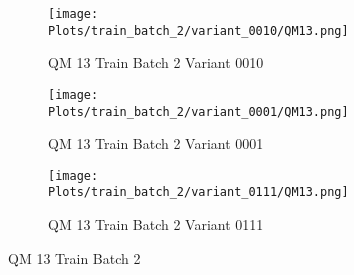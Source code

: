\documentclass{DissertateFigs}
\begin{document}
\begin{figure}[t!]
\medskip

    \begin{subfigure}{0.47\textwidth}
    \texttt{[image: Plots/train\_batch\_2/variant\_0010/QM13.png]}
    \caption{QM 13 Train Batch 2 Variant 0010}
    \end{subfigure}
    \begin{subfigure}{0.47\textwidth}
    \texttt{[image: Plots/train\_batch\_2/variant\_0001/QM13.png]}
    \caption{QM 13 Train Batch 2 Variant 0001}
    \end{subfigure}

\medskip

    \begin{subfigure}{0.47\textwidth}
    \texttt{[image: Plots/train\_batch\_2/variant\_0111/QM13.png]}
    \caption{QM 13 Train Batch 2 Variant 0111}
    \end{subfigure}
\caption{QM 13 Train Batch 2}
    \end{figure}
\clearpage
\end{document}
